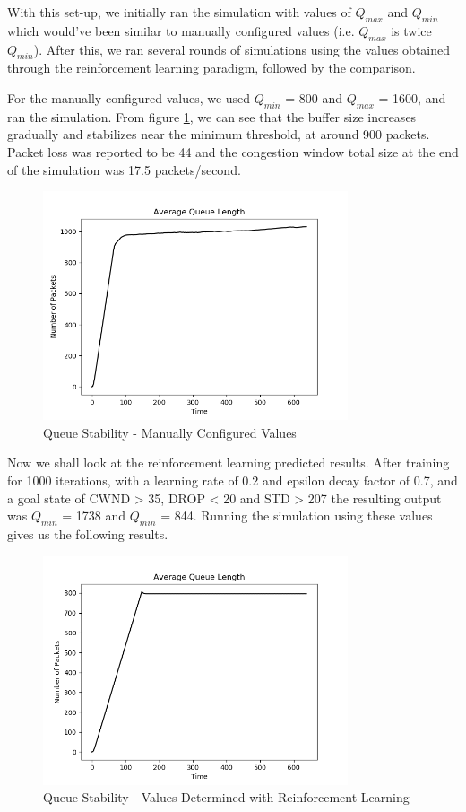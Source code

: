 \documentclass[conference, 10pt]{IEEEtran}
\begin{document}
With this set-up, we initially ran the simulation with values of $Q_{max}$ and $Q_{min}$ which would've been similar to manually configured values (i.e. $Q_{max}$ is twice $Q_{min}$). After this, we ran several rounds of simulations using the values obtained through the reinforcement learning paradigm, followed by the comparison.

For the manually configured values, we used $Q_{min}$ = 800 and $Q_{max}$ = 1600, and ran the simulation. From figure \ref{fig:stable1}, we can see that the buffer size increases gradually and stabilizes near the minimum threshold, at around 900 packets. Packet loss was reported to be 44 and the congestion window total size at the end of the simulation was 17.5 packets/second. 

\begin{figure}[ht!]
	\centering
	\includegraphics[width = 90mm]{Stable1.png}
	\caption{Queue Stability - Manually Configured Values}
	\label{fig:stable1}
\end{figure}

Now we shall look at the reinforcement learning predicted results. After training for 1000 iterations, with a learning rate of 0.2 and epsilon decay factor of 0.7, and a goal state of CWND > 35, DROP < 20 and STD > 207 the resulting output was $Q_{min}$ = 1738 and $Q_{min}$ = 844. Running the simulation using these values gives us the following results. 

\begin{figure}[ht!]
	\centering
	\includegraphics[width = 90mm]{Stable2.png}
	\caption{Queue Stability - Values Determined with Reinforcement Learning}
	\label{fig:stable2}
\end{figure}
\end{document}
